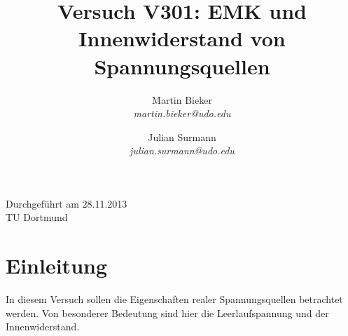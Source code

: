 \documentclass[11pt,ngerman,a4paper]{article}
\title{\textbf{Versuch V301: EMK und Innenwiderstand von Spannungsquellen}}
\author{Martin Bieker \\ \textit{martin.bieker@udo.edu} \and Julian Surmann \\ \textit{julian.surmann@udo.edu}}
\date{}
\begin{document}
\renewcommand\tablename{Tabelle}
\renewcommand\figurename{Abbildung}
\maketitle
\thispagestyle{empty}
\begin{center} Durchgeführt am 28.11.2013\\ TU Dortmund \end{center}


\newpage
\clearpage
\setcounter{page}{1}

\section{Einleitung}
In diesem Versuch sollen die Eigenschaften realer Spannungsquellen betrachtet werden. Von besonderer Bedeutung sind hier die Leerlaufspannung und der Innenwiderstand.
\end{document}
